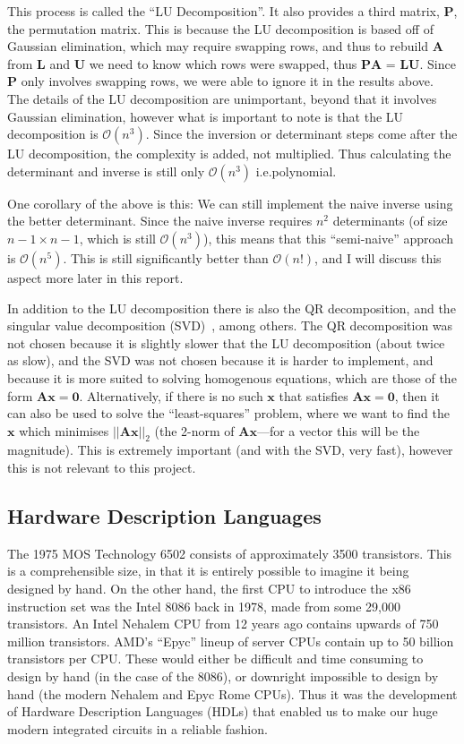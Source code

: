 \documentclass[12pt]{article}
\begin{document}
This process is called the ``LU Decomposition''\cite{lu_decomposition}. It also provides a third matrix, $\mathbf{P}$, the permutation matrix. This is because the LU decomposition is based off of Gaussian elimination, which may require swapping rows, and thus to rebuild $\mathbf{A}$ from $\mathbf{L}$ and $\mathbf{U}$ we need to know which rows were swapped, thus $\mathbf{PA}$ = $\mathbf{LU}$. Since $\mathbf{P}$ only involves swapping rows, we were able to ignore it in the results above. The details of the LU decomposition are unimportant, beyond that it involves Gaussian elimination, however what is important to note is that the LU decomposition is $\mathcal{O}(n^3)$. Since the inversion or determinant steps come after the LU decomposition, the complexity is added, not multiplied. Thus calculating the determinant and inverse is still only $\mathcal{O}(n^3)$ i.e.\@ polynomial.

One corollary of the above is this: We can still implement the naive inverse using the better determinant. Since the naive inverse requires $n^2$ determinants (of size $n-1 \times n-1$, which is still $\mathcal{O}(n^3)$), this means that this ``semi-naive'' approach is $\mathcal{O}(n^5)$. This is still significantly better than $\mathcal{O}(n!)$, and I will discuss this aspect more later in this report.

In addition to the LU decomposition there is also the QR decomposition, and the singular value decomposition (SVD)~\cite{num_lin_alg}, among others. The QR decomposition was not chosen because it is slightly slower that the LU decomposition (about twice as slow), and the SVD was not chosen because it is harder to implement, and because it is more suited to solving homogenous equations, which are those of the form $\mathbf{A}\mathbf{x}=\mathbf{0}$. Alternatively, if there is no such $\mathbf{x}$ that satisfies $\mathbf{A}\mathbf{x}=\mathbf{0}$, then it can also be used to solve the ``least-squares'' problem, where we want to find the $\mathbf{x}$ which minimises $||\mathbf{Ax}||_2$ (the 2-norm of $\mathbf{Ax}$---for a vector this will be the magnitude). This is extremely important (and with the SVD, very fast), however this is not relevant to this project.

\subsection{Hardware Description Languages}

The 1975 MOS Technology 6502 consists of approximately 3500 transistors. This is a comprehensible size, in that it is entirely possible to imagine it being designed by hand. On the other hand, the first CPU to introduce the x86 instruction set was the Intel 8086 back in 1978, made from some 29,000 transistors. An Intel Nehalem CPU from 12 years ago contains upwards of 750 million transistors. AMD's ``Epyc'' lineup of server CPUs contain up to 50 billion transistors per CPU. These would either be difficult and time consuming to design by hand (in the case of the 8086), or downright impossible to design by hand (the modern Nehalem and Epyc Rome CPUs). Thus it was the development of Hardware Description Languages (HDLs) that enabled us to make our huge modern integrated circuits in a reliable fashion.
\end{document}
